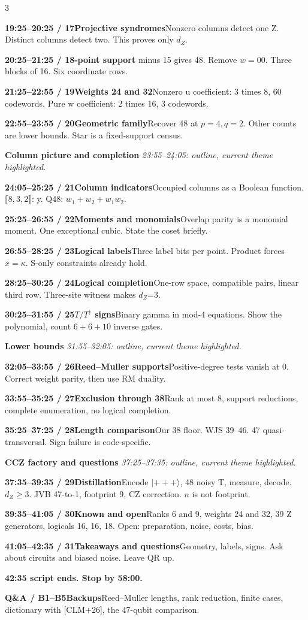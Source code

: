 \documentclass[10pt]{article}
\newcommand{\cue}[3]{\par\textbf{\color{Navy}#1\quad #2}\enspace #3}
\newcommand{\turn}[1]{\par\textbf{\color{Teal}#1}}
\begin{document}
\begin{multicols*}{3}
\cue{19:25--20:25 / 17}{Projective syndromes}{Nonzero columns detect one Z. Distinct columns detect two. This proves only $d_Z$.}
\cue{20:25--21:25 / 18}{48-point support}{63 minus 15 gives 48. Remove $w=00$. Three blocks of 16. Six coordinate rows.}
\cue{21:25--22:55 / 19}{Weights 24 and 32}{Nonzero u coefficient: 3 times 8, 60 codewords. Pure w coefficient: 2 times 16, 3 codewords.}
\cue{22:55--23:55 / 20}{Geometric family}{Recover 48 at $p=4,q=2$. Other counts are lower bounds. Star is a fixed-support census.}
\turn{Column picture and completion}
\textit{23:55--24:05: outline, current theme highlighted.}
\cue{24:05--25:25 / 21}{Column indicators}{Occupied columns as a Boolean function. $\llbracket8,3,2\rrbracket$: y. Q48: $w_1+w_2+w_1w_2$.}
\cue{25:25--26:55 / 22}{Moments and monomials}{Overlap parity is a monomial moment. One exceptional cubic. State the coset briefly.}
\columnbreak
\cue{26:55--28:25 / 23}{Logical labels}{Three label bits per point. Product forces $x=\kappa$. S-only constraints already hold.}
\cue{28:25--30:25 / 24}{Logical completion}{One-row space, compatible pairs, linear third row. Three-site witness makes $d_Z$=3.}
\cue{30:25--31:55 / 25}{$T/T^\dagger$ signs}{Binary gamma in mod-4 equations. Show the polynomial, count $6+6+10$ inverse gates.}
\turn{Lower bounds}
\textit{31:55--32:05: outline, current theme highlighted.}
\cue{32:05--33:55 / 26}{Reed--Muller supports}{Positive-degree tests vanish at 0. Correct weight parity, then use RM duality.}
\cue{33:55--35:25 / 27}{Exclusion through 38}{Rank at most 8, support reductions, complete enumeration, no logical completion.}
\cue{35:25--37:25 / 28}{Length comparison}{Our 38 floor. WJS 39--46. 47 quasi-transversal. Sign failure is code-specific.}
\turn{CCZ factory and questions}
\textit{37:25--37:35: outline, current theme highlighted.}
\cue{37:35--39:35 / 29}{Distillation}{Encode $|{+}{+}{+}\rangle$, 48 noisy T, measure, decode. $d_Z\ge3$. JVB 47-to-1, footprint 9, CZ correction. $n$ is not footprint.}
\cue{39:35--41:05 / 30}{Known and open}{Ranks 6 and 9, weights 24 and 32, 39 Z generators, logicals 16, 16, 18. Open: preparation, noise, costs, bias.}
\cue{41:05--42:35 / 31}{Takeaways and questions}{Geometry, labels, signs. Ask about circuits and biased noise. Leave QR up.}
\turn{42:35 script ends. Stop by 58:00.}
\cue{Q\&A / B1--B5}{Backups}{Reed--Muller lengths, rank reduction, finite cases, dictionary with [CLM+26], the 47-qubit comparison.}\end{multicols*}
\end{document}
